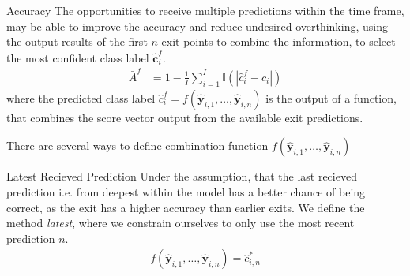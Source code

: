 \begin{enumdescript}
\begin{enumdescript}
		\end{enumdescript}
	
		\item[Accuracy] The opportunities to receive multiple predictions within the time frame, may be able to improve the accuracy and reduce undesired overthinking, using the output results of the first $ n $ exit points to combine the information, to select the most confident class label $ \bm{\hat{c}}^f_i $. 
		\begin{align}
		\bar{A}^f &= 1 - \frac{1}{I} \sum_{i=1}^{I}\mathbb{I}\left(\left|\hat{c}_i^f-c_i\right|\right)
		\end{align}
		where the predicted class label $ \hat{c}_i^f = f(\bm{\hat{y}}_{i,1},\dots, \bm{\hat{y}}_{i,n}) $ is the output of a function, that combines the score vector output from the available exit predictions. 
	
		There are several ways to define combination function $ f\left(\bm{\hat{y}}_{i,1}, \dots, \bm{\hat{y}}_{i,n}\right) $
		\begin{enumdescript}
			
			\item[Latest Recieved Prediction] Under the assumption, that the last recieved prediction i.e. from deepest within the model has a better chance of being correct, as the exit has a higher accuracy than earlier exits. We define the method \emph{latest}, where we constrain ourselves to only use the most recent prediction $n$.
			\begin{align}
			f\left(\bm{\hat{y}}_{i,1}, \dots, \bm{\hat{y}}_{i,n} \right) = \hat{c}_{i,n}^{*}
			\end{align}
			

\end{enumdescript}
\end{enumdescript}
